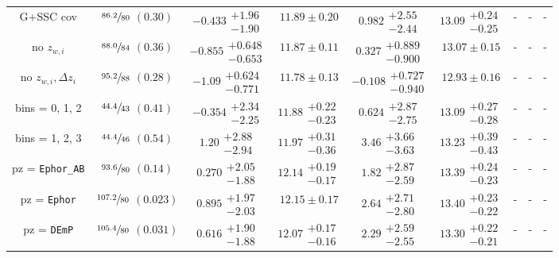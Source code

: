 \documentclass[a4paper,11pt]{article}
\begin{document}
\begin{table}
\begin{center}
\begin{tabular}{ccccccccc}
            G+SSC cov & $\sfrac{86.2}{80}$ $(0.30)$ & $-0.433\substack{+1.96 \\ -1.90}$ & $11.89 \pm 0.20$ & $0.982\substack{+2.55 \\ -2.44}$ & $13.09\substack{+0.24 \\ -0.25}$ & - & - & - \\
            no $z_{w, i}$ & $\sfrac{88.0}{84}$ $(0.36)$ & $-0.855\substack{+0.648 \\ -0.653}$ & $11.87 \pm 0.11$ & $0.327\substack{+0.889 \\ -0.900}$ & $13.07 \pm 0.15$ & - & - & - \\
            no $z_{w, i}, \Delta z_{i}$ & $\sfrac{95.2}{88}$ $(0.28)$ & $-1.09\substack{+0.624 \\ -0.771}$ & $11.78 \pm 0.13$ & $-0.108\substack{+0.727 \\ -0.940}$ & $12.93 \pm 0.16$ & - & - & - \\
            bins = 0, 1, 2 & $\sfrac{44.4}{43}$ $(0.41)$ & $-0.354\substack{+2.34 \\ -2.25}$ & $11.88\substack{+0.22 \\ -0.23}$ & $0.624\substack{+2.87 \\ -2.75}$ & $13.09\substack{+0.27 \\ -0.28}$ & - & - & - \\
            bins = 1, 2, 3 & $\sfrac{44.4}{46}$ $(0.54)$ & $1.20\substack{+2.88 \\ -2.94}$ & $11.97\substack{+0.31 \\ -0.36}$ & $3.46\substack{+3.66 \\ -3.63}$ & $13.23\substack{+0.39 \\ -0.43}$ & - & - & - \\
            pz = \texttt{Ephor\_AB} & $\sfrac{93.6}{80}$ $(0.14)$ & $0.270\substack{+2.05 \\ -1.88}$ & $12.14\substack{+0.19 \\ -0.17}$ & $1.82\substack{+2.87 \\ -2.59}$ & $13.39\substack{+0.24 \\ -0.23}$ & - & - & - \\
            pz = \texttt{Ephor} & $\sfrac{107.2}{80}$ $(0.023)$ & $0.895\substack{+1.97 \\ -2.03}$ & $12.15 \pm 0.17$ & $2.64\substack{+2.71 \\ -2.80}$ & $13.40\substack{+0.23 \\ -0.22}$ & - & - & - \\
            pz = \texttt{DEmP} & $\sfrac{105.4}{80}$ $(0.031)$ & $0.616\substack{+1.90 \\ -1.88}$ & $12.07\substack{+0.17 \\ -0.16}$ & $2.29\substack{+2.59 \\ -2.55}$ & $13.30\substack{+0.22 \\ -0.21}$ & - & - & - \\

\end{tabular}
\end{center}
\end{table}
\end{document}
